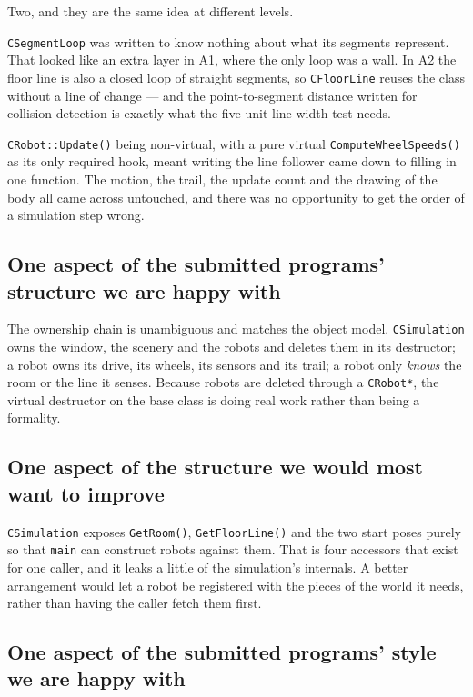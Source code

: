 \documentclass[10pt]{article}
\begin{document}
Two, and they are the same idea at different levels.

\texttt{CSegmentLoop} was written to know nothing about what its segments
represent. That looked like an extra layer in A1, where the only loop was a
wall. In A2 the floor line is also a closed loop of straight segments, so
\texttt{CFloorLine} reuses the class without a line of change --- and
the point-to-segment distance written for collision detection is exactly what
the five-unit line-width test needs.

\texttt{CRobot::Update()} being non-virtual, with a pure virtual
\texttt{ComputeWheelSpeeds()} as its only required hook, meant writing the
line follower came down to filling in one function. The motion, the trail, the
update count and the drawing of the body all came across untouched, and there
was no opportunity to get the order of a simulation step wrong.

\subsection{One aspect of the submitted programs' structure we are happy with}

The ownership chain is unambiguous and matches the object model.
\texttt{CSimulation} owns the window, the scenery and the robots and deletes
them in its destructor; a robot owns its drive, its wheels, its sensors and
its trail; a robot only \emph{knows} the room or the line it senses. Because
robots are deleted through a \texttt{CRobot*}, the virtual destructor on the
base class is doing real work rather than being a formality.

\subsection{One aspect of the structure we would most want to improve}

\texttt{CSimulation} exposes \texttt{GetRoom()}, \texttt{GetFloorLine()} and
the two start poses purely so that \texttt{main} can construct robots against
them. That is four accessors that exist for one caller, and it leaks a little
of the simulation's internals. A better arrangement would let a robot be
registered with the pieces of the world it needs, rather than having the
caller fetch them first.

\subsection{One aspect of the submitted programs' style we are happy with}
\end{document}
